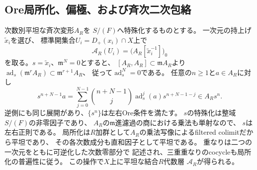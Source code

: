 \subsection{Ore局所化、偏極、および斉次二次包絡}
次数別平坦な斉次変形$A_R$を
$S/(F)$へ特殊化するものとする。
一次元の持上げ$\widetilde x_i$を選び、
標準開集合$U_i=D_+(x_i)\cap X$上で
\[
 \mathscr A_R(U_i)=
 \bigl(A_R[\widetilde x_i^{-1}]\bigr)_0
\]
を取る。$s=\widetilde x_i$、$\mathfrak m^N=0$とすると、
$[A_R,A_R]\subset\mathfrak m A_R$より
$\operatorname{ad}_s(\mathfrak m^rA_R)\subset\mathfrak m^{r+1}A_R$、
従って$\operatorname{ad}_s^N=0$である。
任意の$n\ge1$と$a\in A_R$に対し
\[
 s^{n+N-1}a=
 \sum_{j=0}^{N-1}\binom{n+N-1}{j}
 \operatorname{ad}_s^j(a)s^{n+N-1-j}\in A_Rs^n.
\]
逆側にも同じ展開があり、$\{s^n\}$は左右Ore条件を満たす。
$s$の特殊化は整域$S/(F)$の非零因子であり、
$A_R$の$\mathfrak m$進濾過の商における乗法も単射なので、
$s$は左右正則である。
局所化は$R$加群として$A_R$の乗法写像によるfiltered colimitだから平坦であり、
その各次数成分も直和因子として平坦である。
重なりは二つの一次元をともに可逆化した次数零部分で
記述され、三重重なりのcocycleも局所化の普遍性に従う。
この操作で$X$上に平坦な結合$R$代数層
$\mathscr A_R$が得られる。


